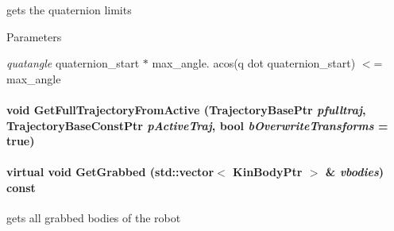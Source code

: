 gets the quaternion limits 


\begin{DoxyParams}{Parameters}
\item[{\em quatangle}]quaternion\_\-start $\ast$ max\_\-angle. acos(q dot quaternion\_\-start) $<$= max\_\-angle \end{DoxyParams}
\hypertarget{classOpenRAVE_1_1RobotBase_a84070a927466aa5da331649c94b5e854}{
\paragraph[{GetFullTrajectoryFromActive}]{\setlength{\rightskip}{0pt plus 5cm}void GetFullTrajectoryFromActive (TrajectoryBasePtr {\em pfulltraj}, \/  TrajectoryBaseConstPtr {\em pActiveTraj}, \/  bool {\em bOverwriteTransforms} = {\ttfamily true})}\hfill}
\label{classOpenRAVE_1_1RobotBase_a84070a927466aa5da331649c94b5e854}
\hypertarget{classOpenRAVE_1_1RobotBase_a39f91578d76bc2c4f2182aeb6c49a2ef}{
\paragraph[{GetGrabbed}]{\setlength{\rightskip}{0pt plus 5cm}virtual void GetGrabbed (std::vector$<$ KinBodyPtr $>$ \& {\em vbodies}) const}\hfill}
\label{classOpenRAVE_1_1RobotBase_a39f91578d76bc2c4f2182aeb6c49a2ef}


gets all grabbed bodies of the robot 



